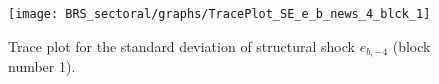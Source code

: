 \begin{figure}[H]
\centering
  \texttt{[image: BRS\_sectoral/graphs/TracePlot\_SE\_e\_b\_news\_4\_blck\_1]}\\
    \caption{Trace plot for the standard deviation of structural shock ${e_{b,-4}}$ (block number 1).}
\end{figure}
